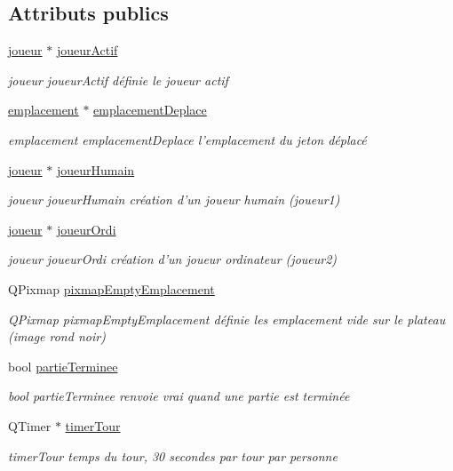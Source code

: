\subsection*{Attributs publics}
\begin{DoxyCompactItemize}
\item 
\hyperlink{classjoueur}{joueur} $\ast$ \hyperlink{class_main_window_a267d43ab6a839ee5f91869efa84cf271}{joueur\-Actif}
\begin{DoxyCompactList}\small\item\em joueur joueur\-Actif  définie le joueur actif \end{DoxyCompactList}\item 
\hyperlink{classemplacement}{emplacement} $\ast$ \hyperlink{class_main_window_ad334c5c1d3c58a97eb424324b3c6225e}{emplacement\-Deplace}
\begin{DoxyCompactList}\small\item\em emplacement emplacement\-Deplace  l'emplacement du jeton déplacé \end{DoxyCompactList}\item 
\hyperlink{classjoueur}{joueur} $\ast$ \hyperlink{class_main_window_a5d1e13ecdb63fa88e114565df70613aa}{joueur\-Humain}
\begin{DoxyCompactList}\small\item\em joueur joueur\-Humain  création d'un joueur humain (joueur1) \end{DoxyCompactList}\item 
\hyperlink{classjoueur}{joueur} $\ast$ \hyperlink{class_main_window_a7ce2a641dae02c27242c9bca5ec2174f}{joueur\-Ordi}
\begin{DoxyCompactList}\small\item\em joueur joueur\-Ordi  création d'un joueur ordinateur (joueur2) \end{DoxyCompactList}\item 
Q\-Pixmap \hyperlink{class_main_window_a40ca81795033b7d295527bc860f716cf}{pixmap\-Empty\-Emplacement}
\begin{DoxyCompactList}\small\item\em Q\-Pixmap pixmap\-Empty\-Emplacement  définie les emplacement vide sur le plateau (image rond noir) \end{DoxyCompactList}\item 
bool \hyperlink{class_main_window_a00d26707b5d27cc6ce07479a46244692}{partie\-Terminee}
\begin{DoxyCompactList}\small\item\em bool partie\-Terminee  renvoie vrai quand une partie est terminée \end{DoxyCompactList}\item 
Q\-Timer $\ast$ \hyperlink{class_main_window_a6d86dd50bcd7dc534fbc9fd374260554}{timer\-Tour}
\begin{DoxyCompactList}\small\item\em timer\-Tour  temps du tour, 30 secondes par tour par personne \end{DoxyCompactList}\end{DoxyCompactItemize}


